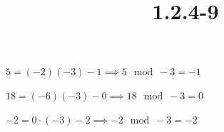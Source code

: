 \documentclass{article}
\title{1.2.4-9}
\begin{document}
\maketitle

\( 5 = (-2)(-3) - 1 \implies 5 \mod -3 = -1 \)

\( 18 = (-6)(-3) - 0 \implies 18 \mod -3 = 0 \)

\( -2 = 0 \cdot (-3) - 2 \implies -2 \mod -3 = -2 \)
\end{document}
